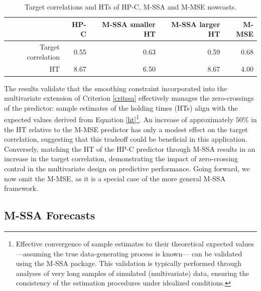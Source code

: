 \documentclass[a4paper]{article}
\begin{document}
\begin{table}[ht]
\centering
\begin{tabular}{rrrrr}
  \hline
 & HP-C & M-SSA smaller HT & M-SSA larger HT & M-MSE \\ 
  \hline
Target correlation & 0.55 & 0.63 & 0.59 & 0.68 \\ 
  HT & 8.67 & 6.50 & 8.67 & 4.00 \\ 
   \hline
\end{tabular}
\caption{Target correlations and HTs of HP-C, M-SSA and M-MSE nowcasts.  } 
\label{corhtnow}
\end{table}The results validate that the smoothing constraint incorporated into the multivariate extension of Criterion \eqref{critssa} effectively manages the zero-crossings of the predictor: sample estimates of the holding times (HTs) align with the expected values derived from Equation \eqref{ht}\footnote{Effective convergence of sample estimates to their theoretical expected values —assuming the true data-generating process is known— can be validated using the M-SSA package. This validation is typically performed through analyses of very long samples of simulated (multivariate) data, ensuring the consistency of the estimation procedures under idealized conditions.}. An increase of approximately $50\%$ in the HT relative to the M-MSE predictor has only a modest effect on the target correlation, suggesting that this tradeoff could be beneficial in this application. Conversely, matching the HT of the HP-C predictor through M-SSA results in an increase in the target correlation, demonstrating the impact of zero-crossing control in the multivariate design on predictive performance. Going forward, we now omit the M-MSE, as it is a special case of the more general M-SSA framework.


\subsection{M-SSA Forecasts}
\end{document}

